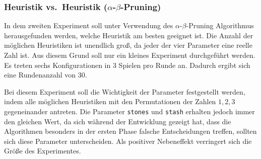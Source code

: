 \documentclass[11pt]{article}
\begin{document}
    \hypertarget{heuristik-vs.heuristik-ux3b1-ux3b2-pruning}{%
\subsubsection{Heuristik vs.~Heuristik
($\alpha$-$\beta$-Pruning)}\label{heuristik-vs.heuristik-ux3b1-ux3b2-pruning}}

In dem zweiten Experiment soll unter Verwendung des $\alpha$-$\beta$-Pruning
Algorithmus herausgefunden werden, welche Heuristik am besten geeignet
ist. Die Anzahl der möglichen Heuristiken ist unendlich groß, da jeder
der vier Parameter eine reelle Zahl ist. Aus diesem Grund soll nur ein
kleines Experiment durchgeführt werden. Es treten sechs Konfigurationen
in 3 Spielen pro Runde an. Dadurch ergibt sich eine Rundenanzahl von 30.

Bei diesem Experiment soll die Wichtigkeit der Parameter festgestellt
werden, indem alle möglichen Heuristiken mit den Permutationen der
Zahlen \(1, 2, 3\) gegeneinander antreten. Die Parameter \texttt{stones}
und \texttt{stash} erhalten jedoch immer den gleichen Wert, da sich
während der Entwicklung gezeigt hat, dass die Algorithmen besonders in
der ersten Phase falsche Entscheidungen treffen, sollten sich diese
Parameter unterscheiden. Als positiver Nebeneffekt verringert sich die
Größe des Experimentes.
\end{document}
